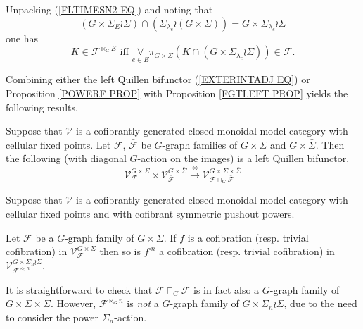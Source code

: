 \documentclass[a4paper,10pt]{article}%
\begin{document}
\begin{remark}\label{UNPACKINGLTIMES REM}
Unpacking (\ref{FLTIMESN2 EQ}) and noting that
\[
	\left(G \times \Sigma_E \wr \Sigma\right)
\cap
	\left(
	\Sigma_{\lambda_e} \wr (G \times \Sigma)
	\right)
=
	G \times \Sigma_{\lambda_e} \wr \Sigma
\]
 one has  
\begin{equation}\label{FLTIMESN2G EQ}
	K \in \mathcal{F}^{\ltimes_G E} 
	\text{ iff }
	\underset{e \in E}{\forall} \pi_{G \times \Sigma}
	\left(
		K \cap 
		\left(G \times \Sigma_{\lambda_e} \wr \Sigma \right)
	\right)
	\in \mathcal{F}.
\end{equation}
\end{remark}


Combining either the left Quillen bifunctor (\ref{EXTERINTADJ EQ}) or 
Proposition \ref{POWERF PROP}
with Proposition \ref{FGTLEFT PROP} yields the following results.


\begin{proposition}\label{EXTERINTADJG PROP}
Suppose that $\mathcal{V}$ is a cofibrantly generated closed monoidal model category with cellular fixed points.
Let $\mathcal{F}$, $\bar{\mathcal{F}}$ be $G$-graph families of 
$G \times \Sigma$ and $G \times \bar{\Sigma}$. Then the following (with diagonal $G$-action on the images) 
is a left Quillen bifunctor.
	\begin{equation}\label{EXTERINTADJG EQ}
	\mathcal{V}^{G \times \Sigma}_{\mathcal{F}}
		\times
	\mathcal{V}^{G \times \bar{\Sigma}}_{\bar{\mathcal{F}}}
		\xrightarrow{\otimes}
		\mathcal{V}^{G \times \Sigma \times \bar{\Sigma}}_{
	\mathcal{F} \sqcap_G \bar{\mathcal{F}}}
\end{equation}
\end{proposition}


\begin{proposition}\label{POWERFG PROP}
Suppose that $\mathcal{V}$ is a cofibrantly generated closed monoidal model category with cellular fixed points and with cofibrant symmetric pushout powers.
	
	Let $\mathcal{F}$ be a $G$-graph family of $G \times \Sigma$. If $f$ is a cofibration (resp. trivial cofibration) in
	$\mathcal{V}^{G \times \Sigma}_{\mathcal{F}}$
	then so is $f^{\square n}$
a cofibration (resp. trivial cofibration) in 
	$\mathcal{V}^{G \times \Sigma_n \wr \Sigma}_{\mathcal{F}^{\ltimes_{G} n}}$.
\end{proposition}


\begin{remark}
	It is straightforward to check that 
	$\mathcal{F} \sqcap_G \bar{\mathcal{F}}$
	is in fact also a $G$-graph family of $G \times \Sigma \times \bar{\Sigma}$.
	However, $\mathcal{F}^{\ltimes_G n}$ is \textit{not}
	a $G$-graph family of $G \times \Sigma_n \wr \Sigma$,
	due to the need to consider the power $\Sigma_n$-action.
\end{remark}
\end{document}
